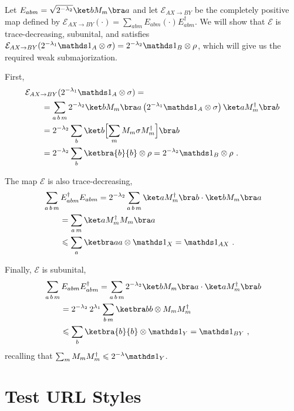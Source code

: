 \documentclass[10pt,letterpaper]{article}
\theoremstyle{plain}
\newenvironment{myproof}[1][\proofname]{%
  \color{prooftextcolor} \footnotesize \proof[\itshape #1]\hspace*{1.2mm}%
}{\endproof}
\begin{document}
\begin{myproof}[Proof of Prop.~\ref{prop:LambdaMajorizationTMap}]
  Let $E_{abm} = \sqrt{2^{-\lambda_2}} \ket b M_m \bra a$ and let $\mathcal{E}_{AX\rightarrow BY}$ be the
  completely positive map defined by $\mathcal{E}_{AX\rightarrow BY}(\cdot) =
  \sum_{abm} E_{abm}\left(\cdot\right)E_{abm}^\dagger$. We will show that $\mathcal{E}$ is trace-decreasing,
  subunital, and satisfies $\mathcal{E}_{AX\rightarrow BY}(2^{-\lambda_1}\Ident_A\otimes\sigma) =
  2^{-\lambda_2}\Ident_B\otimes\rho$,
  which will give us the required weak submajorization.
  
  First,
  \begin{align*}
    &\mathcal{E}_{AX\rightarrow BY}(2^{-\lambda_1}\Ident_A\otimes\sigma) = \\
    &\qquad = \sum_{a\,b\,m} 2^{-\lambda_2} \ket b M_m \bra a \left(2^{-\lambda_1}\Ident_A\otimes\sigma\right)
    \ket a M_m^\dagger \bra b \\
    &\qquad = 2^{-\lambda_2} \sum_{b} \ket b \Bigl[\sum_m M_m \sigma M_m^\dagger \Bigr] \bra b \\
    &\qquad = 2^{-\lambda_2} \sum_b \ketbra{b}{b}\otimes \rho  = 2^{-\lambda_2}\Ident_B\otimes\rho\ .
  \end{align*}

  The map $\mathcal{E}$ is also trace-decreasing,
  \begin{align*}
    &\sum_{a\,b\,m} E_{abm}^\dagger E_{abm} = 2^{-\lambda_2} \sum_{a\,b\,m} \ket a M_m^\dagger \bra b\cdot
    \ket b M_m \bra a \\
    &\qquad = \sum_{a\,m} \ket a M_m^\dagger M_m \bra a \\
    &\qquad \leqslant \sum_a \ketbra aa \otimes \Ident_X
    = \Ident_{AX}\ .
  \end{align*}

  Finally, $\mathcal{E}$ is subunital,
  \begin{align*}
    &\sum_{a\,b\,m} E_{abm} E_{abm}^\dagger
    = \sum_{a\,b\,m} 2^{-\lambda_2} \ket b M_m \bra a \cdot \ket a M_m^\dagger \bra b \\
    &\qquad = 2^{-\lambda_2}\,2^{\lambda_1} \sum_{b\,m} \ketbra bb \otimes M_m M_m^\dagger \\
    &\qquad \leqslant \sum_b \ketbra{b}{b}\otimes \Ident_Y = \Ident_{BY}\ ,
  \end{align*}
  recalling that $\sum_m M_m M_m^\dagger \leqslant 2^{-\lambda}\Ident_Y$.
\end{myproof}


\section*{Test URL Styles}
\end{document}

